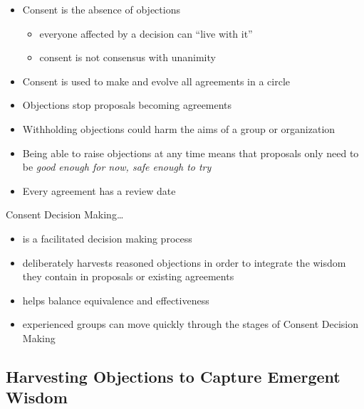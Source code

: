 \begin{itemize}
\item Consent is the absence of objections

\begin{itemize}
\item everyone affected by a decision can ``live with it''

\item consent is not consensus with unanimity

\end{itemize}

\item Consent is used to make and evolve all agreements in a circle

\item Objections stop proposals becoming agreements

\item Withholding objections could harm the aims of a group or organization

\item Being able to raise objections at any time means that proposals only need to be \emph{good enough for now, safe enough to try}

\item Every agreement has a review date

\end{itemize}

Consent Decision Making{\ldots}

\begin{itemize}
\item is a facilitated decision making process

\item deliberately harvests reasoned objections in order to integrate the wisdom they contain in proposals or existing agreements

\item helps balance equivalence and effectiveness

\item experienced groups can move quickly through the stages of Consent Decision Making

\end{itemize}

\subsection{Harvesting Objections to Capture Emergent Wisdom}
\label{harvestingobjectionstocaptureemergentwisdom}

